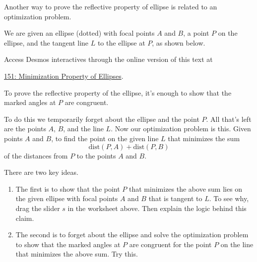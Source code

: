 \documentclass{ximera}
\begin{document}
\begin{question}  \label{Q5445rggfbhyhyrdt}

Another way to prove the reflective property of ellipse is related to an optimization problem.

We are given an ellipse (dotted) with focal points $A$ and $B$, a point $P$ on the ellipse, and the tangent line $L$ to the ellipse at $P$, as shown below.


\begin{onlineOnly}
    \begin{center}
\end{center}
\end{onlineOnly}

Access Desmos interactives through the online version of this text at
 
\href{https://www.desmos.com/calculator/ncyrefzwwg}{151: Minimization Property of Ellipses}.


To prove the reflective property of the ellipse, it's enough to show that the marked angles at $P$ are congruent.

To do this we temporarily forget about the ellipse and the point $P$. All that's left are the points $A$, $B$, and the line $L$. Now our optimization problem is this. Given points $A$ and $B$, to find the point on the given line $L$ that minimizes the sum 
\[
   \text{dist}(P,A) + \text{dist}(P,B)
\]
of the distances from $P$ to the points $A$ and $B$.

There are two key ideas.

\begin{enumerate}
\item The first is to show that the point $P$ that minimizes the above sum lies on the given ellipse with focal points $A$ and $B$ that is tangent to $L$. To see why, drag the slider $s$ in the worksheet above. Then explain the logic behind this claim.

\item The second is to forget about the ellipse and solve the optimization problem to show that the marked angles at $P$ are congruent for the point $P$ on the line that minimizes the above sum. Try this.

\end{enumerate}


\end{question}
\end{document}
